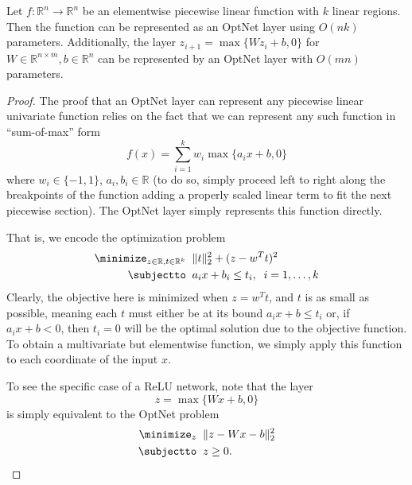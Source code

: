 \begin{theorem}
  \label{theorem:pwlinear}
Let $f: \mathbb{R}^n \rightarrow \mathbb{R}^n$ be an elementwise piecewise
linear function with $k$ linear regions.  Then the function can be represented
as an OptNet layer using $O(nk)$ parameters.  Additionally, the layer $z_{i+1} =
\max\{Wz_i + b, 0\}$ for $W \in \mathbb{R}^{n \times m}, b \in \mathbb{R}^n$ can
be represented by an OptNet layer with $O(mn)$ parameters.
\end{theorem}

\begin{proof}
The proof that an OptNet layer can represent any piecewise linear univariate
function relies on the fact that we can represent any such function in
``sum-of-max'' form
\begin{equation}
  f(x) = \sum_{i=1}^k w_i \max\{a_i x + b, 0\}
\end{equation}
where $w_i \in \{-1,1\}$, $a_i,b_i \in \mathbb{R}$ (to do so, simply proceed
left to right along the breakpoints of the function adding a properly scaled
linear term to fit the next piecewise section).  The OptNet layer simply
represents this function directly.

That is, we encode the optimization problem
\begin{equation}
  \begin{split}
  \minimize_{z \in \mathbb{R},t\in \mathbb{R}^k} \;\; &  \|t\|_2^2 + (z - w^T t)^2 \\
  \subjectto \;\; & a_i x + b_i \leq t_i, \;\; i=1,\ldots,k
\end{split}
\end{equation}
Clearly, the objective here is minimized when $z = w^T t$, and $t$ is as small
as possible, meaning each $t$ must either be at its bound $a_i x + b \leq
t_i$ or, if $a_i x + b < 0$, then $t_i = 0$ will be the optimal solution due to
the objective function.  To obtain a multivariate but elementwise function, we
simply apply
this function to each coordinate of the input $x$.

To see the specific case of a ReLU network, note that the layer
\begin{equation}
  z = \max\{Wx + b, 0\}
\end{equation}
is simply equivalent to the OptNet problem
\begin{equation}
  \begin{split}
  \minimize_{z} \;\; & \|z - Wx - b\|_2^2 \\
  \subjectto \;\; & z \geq 0.
  \end{split}
\end{equation}
\end{proof}


